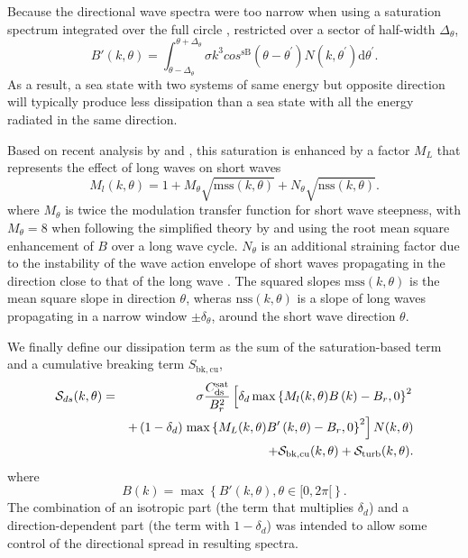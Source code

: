 Because the directional wave spectra were too narrow when using a
saturation spectrum integrated over the full circle \citep{art:AL06},
\citet{art:Aea10} restricted over a sector of half-width $\Delta_\theta$,
\begin{equation}
B'\left(k,\theta\right)=
\int_{\theta-\Delta_\theta}^{\theta+\Delta_\theta} \sigma k^3 cos^{\mathrm{sB}}\left(\theta-
\theta^{\prime}\right) N(k,\theta^{\prime}) \mathrm d
\theta^{\prime} \label{defBofkprime}.
\end{equation}
As a result, a sea state with two systems of same energy but opposite
direction will typically produce less dissipation than a sea state with all
the energy radiated in the same direction.

Based on recent analysis by \cite{Guimaraes2018} and \cite{Peureux&al.2019}, this saturation is enhanced by a factor $M_L$ that represents 
the effect of long waves on short waves 
\begin{equation}
M_l(k,\theta)=1+M_\theta \sqrt{\mathrm{mss}(k,\theta)} + N_\theta \sqrt{\mathrm{nss}(k,\theta)} \label{defFACSAT}.
\end{equation}
where $M_\theta$ is twice the modulation transfer function for short wave steepness, with 
$M_\theta=8$ when following the simplified theory by \cite{art:LHS60} and using the root mean square enhancement of $B$ over a 
long wave cycle. $N_\theta$ is an additional straining factor due to the instability of the wave action envelope of short waves 
propagating in the direction close to that of the long wave \citep{Peureux&al.2019}. The squared slopes $\mathrm{mss}(k,\theta)$ is 
the mean square slope in direction $\theta$, wheras $\mathrm{nss}(k,\theta)$ is a slope of long waves propagating in a narrow window $\pm \delta_\theta$, 
around the short wave direction $\theta$.

We finally define our dissipation term as the sum of the saturation-based term
and a cumulative breaking term $S_{\mathrm{bk,cu}}$,
\begin{eqnarray}
{\cal S}_{ds}(k,\theta)& =&  \sigma
 \frac{C_{\mathrm{ds}}^{\mathrm{sat}}}{B^2_r} \left[ \delta_d
\max\left\{ M_l(k,\theta) B\left(k\right) -
B_r,0\right\}^2 \right.
\nonumber \\
  & & +  \left(1-\delta_d \right) \left. \max\left\{ M_L(k,\theta) B'\left(k,\theta \right)- B_r
 ,0\right\}^2\right]N(k,\theta)  \nonumber \\
 & & + {\cal S}_{\mathrm{bk,cu}}(k,\theta) + {\cal S}_{\mathrm{turb}}(k,\theta) \label{Sds_all}.
\end{eqnarray}
where
\begin{equation}
B\left(k \right)=\max\left\{B'(k,\theta), \theta \in [0,2
\pi[\right\} \label{defBof}.
\end{equation}
The combination of an isotropic part (the term that multiplies $ \delta_d$)
and a direction-dependent part (the term with $1-\delta_d$) was intended to
allow some control of the directional spread in resulting spectra.

